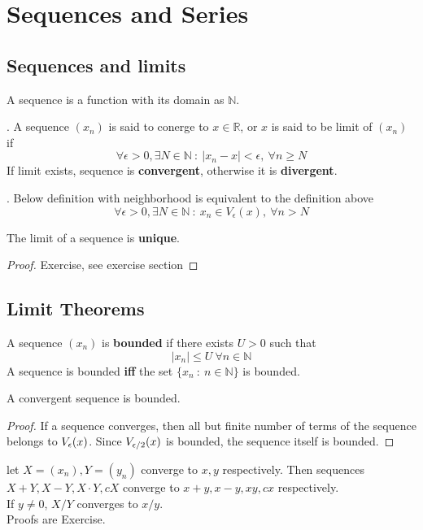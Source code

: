 \chapter{Sequences and Series}
\section{Sequences and limits}
\begin{definition} A sequence is a function with its domain as $\mathbb{N}$.
\end{definition}

\begin{definition}. A sequence $(x_n)$ is said  to conerge to $x \in \mathbb{R}$, or $x$ is said to be limit of $(x_n)$ if
    \[\forall \epsilon > 0,\exists N \in \mathbb{N} \ : \ |x_n - x| < \epsilon, \ \forall n \ge N\]
    If limit exists, sequence is \textbf{convergent}, otherwise it is \textbf{divergent}.
\end{definition}

\begin{definition}. Below definition with neighborhood is equivalent to the definition above
    \[\forall \epsilon > 0, \exists N \in \mathbb{N} \ : \ x_n \in V_{\epsilon}(x), \ \forall n > N\]
\end{definition}

\begin{theorem} The limit of a sequence is \textbf{unique}.
    \begin{proof}
        Exercise, see exercise section
    \end{proof}
\end{theorem}
\section{Limit Theorems}
\begin{definition} A sequence $(x_n)$ is \textbf{bounded} if there exists $U > 0$ such that
    \[ |x_n| \le U \ \forall n \in \mathbb{N}\]
    A sequence is bounded \textbf{iff} the set $\{ x_n \ : \ n \in \mathbb{N}\}$ is bounded.
\end{definition}
\begin{theorem} A convergent sequence is bounded.
    \begin{proof}
        If a sequence converges, then all but finite number of terms of the sequence belongs to $V_{\epsilon}(x)$. Since $V_{\epsilon/2}(x)$ is bounded, the sequence itself is bounded.
    \end{proof}
\end{theorem}
\begin{theorem} let $X= (x_n),Y =(y_n)$ converge to $x,y$ respectively. Then sequences $X+Y,X-Y,X \cdot Y, cX$ converge to $x+y, x-y, xy, cx$ respectively.\\
    If $y \neq 0$, $X/Y$ converges to $x/y$. \\
    Proofs are Exercise.
\end{theorem}

